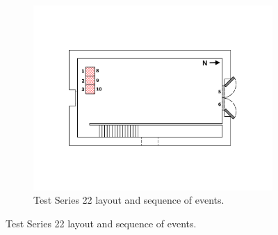 \documentclass[12pt,oneside]{book}
\begin{document}
\begin{figure}[!ht]
\begin{minipage}[b]{0.8\columnwidth}
\begin{flushleft}
\begin{figure}[!ht]
\begin{minipage}[b]{0.9\columnwidth}
	\includegraphics[width=\columnwidth]{../Figures/Floor_Plans/West_Structure_1st_Floor_Test_22}
\end{minipage}
\caption{Test Series 22 layout and sequence of events.}
\label{fig:west_test_22}
\end{figure}


\end{flushleft}
\end{minipage}
\end{figure}
\end{document}
